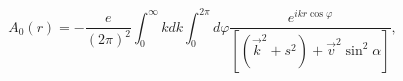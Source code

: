 \begin{equation}
A_{0}(r)=-\frac{e}{\left(  2\pi\right)  ^{2}}\int_{0}^{\infty}kdk\int
_{0}^{2\pi}d\varphi\frac{e^{ikr\cos\varphi}}{\left[  (\overrightarrow{k}%
^{2}+s^{2})+\overrightarrow{v}^{2}\sin^{2}\alpha\right]  },
\end{equation}

